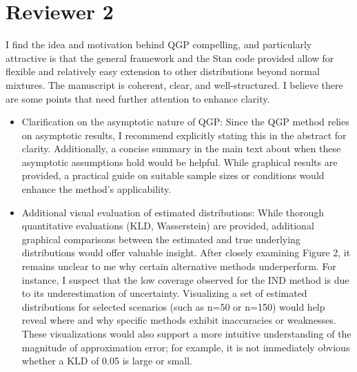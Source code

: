 \documentclass{article}
\begin{document}
  
\section*{Reviewer 2}


I find the idea and motivation behind QGP compelling, and particularly 
attractive is that the general framework and the Stan code provided allow for 
flexible and relatively easy extension to other distributions beyond normal 
mixtures. The manuscript is coherent, clear, and well-structured. I believe 
there are some points that need further attention to enhance clarity.

\begin{itemize}

\item Clarification on the asymptotic nature of QGP:
 Since the QGP method relies on asymptotic results, I recommend explicitly 
 stating this in the abstract for clarity. Additionally, a concise summary in 
 the main text about when these asymptotic assumptions hold would be helpful. 
 While graphical results are provided, a practical guide on suitable sample 
 sizes or conditions would enhance the method's applicability.

\item Additional visual evaluation of estimated distributions:
 While thorough quantitative evaluations (KLD, Wasserstein) are provided, 
 additional graphical comparisons between the estimated and true underlying 
 distributions would offer valuable insight. After closely examining Figure 2, 
 it remains unclear to me why certain alternative methods underperform. For 
 instance, I suspect that the low coverage observed for the IND method is due 
 to its underestimation of uncertainty. Visualizing a set of estimated 
 distributions for selected scenarios (such as n=50 or n=150) would help reveal 
 where and why specific methods exhibit inaccuracies or weaknesses. These 
 visualizations would also support a more intuitive understanding of the 
 magnitude of approximation error; for example, it is not immediately obvious 
 whether a KLD of 0.05 is large or small.


\end{itemize}
\end{document}
